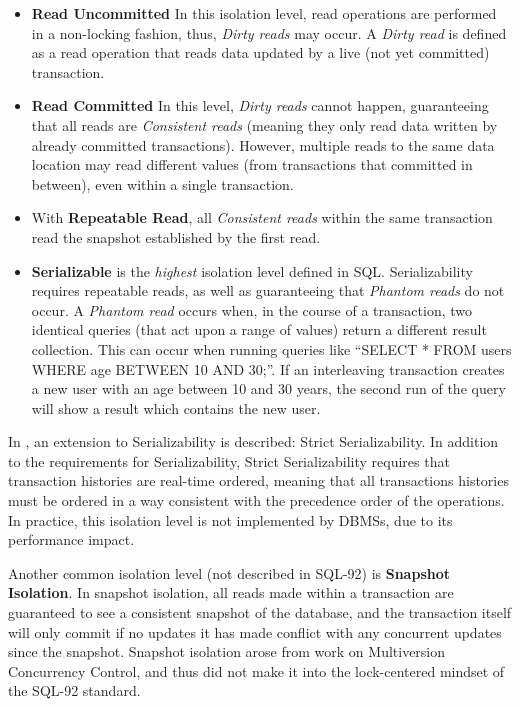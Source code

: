 \documentclass{llncs}
\begin{document}
\begin{itemize}
\item {\bf Read Uncommitted} In this isolation level, read operations
  are performed in a non-locking fashion, thus, {\it Dirty reads} may
  occur. A {\it Dirty read} is defined as a read operation that reads
  data updated by a live (not yet committed) transaction.
\item {\bf Read Committed} In this level, {\it Dirty reads} cannot
  happen, guaranteeing that all reads are {\it Consistent reads}
  (meaning they only read data written by already committed
  transactions). However, multiple reads to the same data location may
  read different values (from transactions that committed in between),
  even within a single transaction.
\item With {\bf Repeatable Read}, all {\it Consistent reads} within
  the same transaction read the snapshot established by the first
  read.
\item {\bf Serializable} is the {\it highest} isolation level defined
  in SQL. Serializability requires repeatable reads, as well as
  guaranteeing that {\it Phantom reads} do not occur. A {\it Phantom
    read} occurs when, in the course of a transaction, two identical
  queries (that act upon a range of values) return a different result
  collection. This can occur when running queries like ``SELECT * FROM
  users WHERE age BETWEEN 10 AND 30;''. If an interleaving transaction
  creates a new user with an age between 10 and 30 years, the second
  run of the query will show a result which contains the new user.
\end{itemize}

In \cite{papadimitriou1979serializability}, an extension to
Serializability is described: Strict Serializability. In addition to
the requirements for Serializability, Strict Serializability requires
that transaction histories are real-time ordered, meaning that all
transactions histories must be ordered in a way consistent with the
precedence order of the operations. In practice, this isolation level
is not implemented by DBMSs, due to its performance impact.

Another common isolation level (not described in SQL-92) is {\bf
  Snapshot Isolation}. In snapshot isolation, all reads made within a
transaction are guaranteed to see a consistent snapshot of the
database, and the transaction itself will only commit if no updates it
has made conflict with any concurrent updates since the
snapshot. Snapshot isolation arose from work on Multiversion
Concurrency Control, and thus did not make it into the lock-centered
mindset of the SQL-92 standard.
\end{document}
